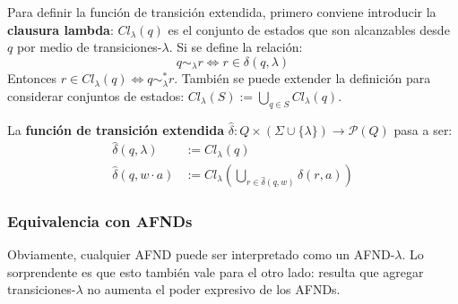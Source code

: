 Para definir la función de transición extendida, primero conviene introducir la \textbf{clausura lambda}: $Cl_\lambda(q)$ es el conjunto de estados que son alcanzables desde $q$ por medio de transiciones-$\lambda$. Si se define la relación:
$$q \sim_\lambda r \iff r \in \delta(q, \lambda)$$
Entonces $r \in Cl_\lambda(q) \iff q \sim_\lambda^* r$. También se puede extender la definición para considerar conjuntos de estados: $Cl_\lambda(S) := \bigcup_{q \in S} Cl_\lambda(q)$.

La \textbf{función de transición extendida} $\hat \delta : Q \times (\Sigma \cup \{\lambda\}) \to \mathcal P (Q)$ pasa a ser:
$$
\begin{aligned}
    \hat \delta (q, \lambda) & := Cl_\lambda(q) \\
    \hat \delta (q, w \cdot a) & := Cl_\lambda\left(\bigcup_{r \in \hat \delta(q, w)} \delta(r, a) \right)
\end{aligned}
$$

\subsubsection{Equivalencia con AFNDs}

Obviamente, cualquier AFND puede ser interpretado como un AFND-$\lambda$. Lo sorprendente es que esto también vale para el otro lado: resulta que agregar transiciones-$\lambda$ no aumenta el poder expresivo de los AFNDs.

